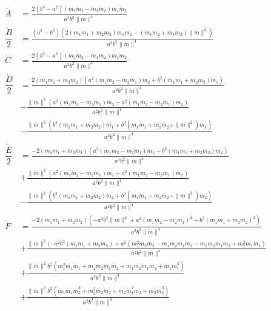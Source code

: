 \begin{align*}
\dot{A} &= \frac{2 ( b^2 - a^{2}) ( \ddot{m}_{1} \dot{m}_{2} - \dot{m}_{1} \ddot{m}_{2}) \dot{m}_{1} \dot{m}_{2}}{a^{2} b^{2} \|\dot{m} \|^4} \\
\dfrac{\dot{B}}{2} &= \frac{(a^{2} - b^{2}) (2 (\dot{m}_{1} \ddot{m}_{1} + \dot{m}_{2} \ddot{m}_{2}) \dot{m}_{1} \dot{m}_{2} - (\dot{m}_{1} \ddot{m}_{2} + \ddot{m}_{1} \dot{m}_{2}) \|\dot{m} \|^2)}{a^{2} b^{2} \|\dot{m} \|^4} \\
\dot{C} &= \frac{2 (b^2 - a^{2}) ( \dot{m}_{1} \ddot{m}_{2} - \ddot{m}_{1} \dot{m}_{2}) \dot{m}_{1} \dot{m}_{2}}{a^{2} b^{2} \|\dot{m} \|^4} \\
\dfrac{\dot{D}}{2} &= \frac{2(\dot{m}_{1} \ddot{m}_{1} + \dot{m}_{2} \ddot{m}_{2}) (a^{2} (m_{1} \dot{m}_{2} - m_{2} \dot{m}_{1}) \dot{m}_{2} + b^{2} (m_{1} \dot{m}_{1} + m_{2} \dot{m}_{2}) \dot{m}_{1})}{a^{2} b^{2} \|\dot{m} \|^4} \\
&- \frac{\|\dot{m} \|^2 (a^{2}(m_{1} \dot{m}_{2} - m_{2} \dot{m}_{1}) \ddot{m}_{2} + a^2 (m_{1} \ddot{m}_{2} - m_{2} \ddot{m}_{1}) \dot{m}_{2})}{a^{2} b^{2} \|\dot{m} \|^4} \\
&- \frac{\|\dot{m} \|^2 ( b^{2}(m_{1} \dot{m}_{1} + m_{2} \dot{m}_{2}) \ddot{m}_{1} + b^2 (m_{1} \ddot{m}_{1} + m_{2} \ddot{m}_{2} + \|\dot{m} \|^2) \dot{m}_{1})}{a^{2} b^{2} \|\dot{m} \|^4} \\
\dfrac{\dot{E}}{2} &= \frac{- 2 (\dot{m}_{1} \ddot{m}_{1} + \dot{m}_{2} \ddot{m}_{2}) (a^{2} (m_{1} \dot{m}_{2} - m_{2} \dot{m}_{1}) \dot{m}_{1} - b^{2} (m_{1} \dot{m}_{1} + m_{2} \dot{m}_{2}) \dot{m}_{2})}{a^{2} b^{2} \|\dot{m} \|^4} \\
&+ \frac{\|\dot{m} \|^2 (a^{2} (m_{1} \dot{m}_{2} - m_{2} \dot{m}_{1}) \ddot{m}_{1} + a^{2} (m_{1} \ddot{m}_{2} - m_{2} \ddot{m}_{1}) \dot{m}_{1})}{a^{2} b^{2} \|\dot{m} \|^4} \\
&- \frac{\|\dot{m} \|^2 (b^{2} (m_{1} \dot{m}_{1} + m_{2} \dot{m}_{2}) \ddot{m}_{2} + b^{2} (m_{1} \ddot{m}_{1} + m_{2} \ddot{m}_{2} + \|\dot{m} \|^2) \dot{m}_{2})}{a^{2} b^{2} \|\dot{m} \|^4} \\
\dot{F} &= \frac{-2(\dot{m}_{1} \ddot{m}_{1} + \dot{m}_{2} \ddot{m}_{2}) (- a^{2} b^{2} \|\dot{m} \|^2 + a^{2} (m_{1}\dot{m}_{2} - m_{2}\dot{m}_{1})^2 + b^{2} (m_{1} \dot{m}_{1} + m_{2} \dot{m}_{2})^{2})}{a^{2} b^{2} \|\dot{m} \|^4} \\
&+ \frac{ \|\dot{m} \|^2 (- a^{2} b^{2} (\dot{m}_{1} \ddot{m}_{1} + \dot{m}_{2} \ddot{m}_{2}) + a^{2} (m_{1}^{2} \dot{m}_{2} \ddot{m}_{2} - m_{1} m_{2} \dot{m}_{1} \ddot{m}_{2} - m_{1} m_{2} \ddot{m}_{1} \dot{m}_{2} + m_{2}^{2} \dot{m}_{1} \ddot{m}_{1})}{a^{2} b^{2} \|\dot{m} \|^4} \\
&+ \frac{ \|\dot{m} \|^2 b^{2} (m_{1}^{2} \dot{m}_{1} \ddot{m}_{1} + m_{1} m_{2} \dot{m}_{1} \ddot{m}_{2} + m_{1} m_{2} \ddot{m}_{1} \dot{m}_{2} + m_{1}\dot{m}_{1}^{3})}{a^{2} b^{2} \|\dot{m} \|^4} \\
&+ \frac {\|\dot{m} \|^2 b^{2} (m_{1} \dot{m}_{1} \dot{m}_{2}^{2} + m_{2}^{2} \dot{m}_{2} \ddot{m}_{2} + m_{2} \dot{m}_{1}^{2} \dot{m}_{2} + m_{2} \dot{m}_{2}^{3})}{a^{2} b^{2} \|\dot{m} \|^4}
\end{align*}

